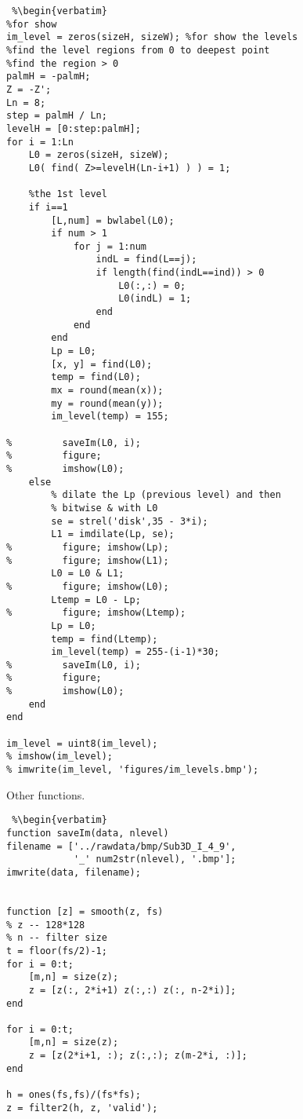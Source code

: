 \begin{lstlisting} %\begin{verbatim}
%for show
im_level = zeros(sizeH, sizeW); %for show the levels
%find the level regions from 0 to deepest point
%find the region > 0
palmH = -palmH;
Z = -Z';
Ln = 8;
step = palmH / Ln;
levelH = [0:step:palmH];
for i = 1:Ln
    L0 = zeros(sizeH, sizeW);
    L0( find( Z>=levelH(Ln-i+1) ) ) = 1;

    %the 1st level
    if i==1
        [L,num] = bwlabel(L0);
        if num > 1
            for j = 1:num
                indL = find(L==j);
                if length(find(indL==ind)) > 0
                    L0(:,:) = 0;
                    L0(indL) = 1;
                end
            end
        end
        Lp = L0;
        [x, y] = find(L0);
        temp = find(L0);
        mx = round(mean(x));
        my = round(mean(y));
        im_level(temp) = 155;

%         saveIm(L0, i);
%         figure;
%         imshow(L0);
    else
        % dilate the Lp (previous level) and then
        % bitwise & with L0
        se = strel('disk',35 - 3*i);
        L1 = imdilate(Lp, se);
%         figure; imshow(Lp);
%         figure; imshow(L1);
        L0 = L0 & L1;
%         figure; imshow(L0);
        Ltemp = L0 - Lp;
%         figure; imshow(Ltemp);
        Lp = L0;
        temp = find(Ltemp);
        im_level(temp) = 255-(i-1)*30;
%         saveIm(L0, i);
%         figure;
%         imshow(L0);
    end
end

im_level = uint8(im_level);
% imshow(im_level);
% imwrite(im_level, 'figures/im_levels.bmp');
\end{lstlisting} %
\clearpage

Other functions.

\begin{lstlisting} %\begin{verbatim}
function saveIm(data, nlevel)
filename = ['../rawdata/bmp/Sub3D_I_4_9',
            '_' num2str(nlevel), '.bmp'];
imwrite(data, filename);


function [z] = smooth(z, fs)
% z -- 128*128
% n -- filter size
t = floor(fs/2)-1;
for i = 0:t;
    [m,n] = size(z);
    z = [z(:, 2*i+1) z(:,:) z(:, n-2*i)];
end

for i = 0:t;
    [m,n] = size(z);
    z = [z(2*i+1, :); z(:,:); z(m-2*i, :)];
end

h = ones(fs,fs)/(fs*fs);
z = filter2(h, z, 'valid');
\end{lstlisting} %
\clearpage
